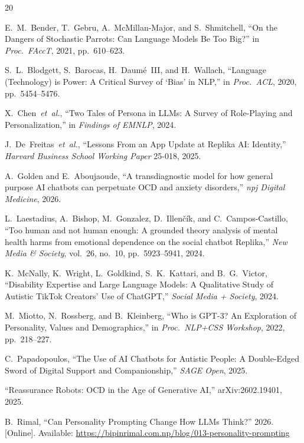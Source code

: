 \documentclass[conference]{IEEEtran}
\begin{document}
\begin{thebibliography}{20}

E.~M.~Bender, T.~Gebru, A.~McMillan-Major, and S.~Shmitchell, ``On the Dangers of Stochastic Parrots: Can Language Models Be Too Big?'' in \textit{Proc.\ FAccT}, 2021, pp.~610--623.

S.~L.~Blodgett, S.~Barocas, H.~Daum\'{e}~III, and H.~Wallach, ``Language (Technology) is Power: A Critical Survey of `Bias' in NLP,'' in \textit{Proc.\ ACL}, 2020, pp.~5454--5476.

X.~Chen~\textit{et~al.}, ``Two Tales of Persona in LLMs: A Survey of Role-Playing and Personalization,'' in \textit{Findings of EMNLP}, 2024.

J.~De~Freitas~\textit{et~al.}, ``Lessons From an App Update at Replika AI: Identity,'' \textit{Harvard Business School Working Paper} 25-018, 2025.

A.~Golden and E.~Aboujaoude, ``A transdiagnostic model for how general purpose AI chatbots can perpetuate OCD and anxiety disorders,'' \textit{npj Digital Medicine}, 2026.

L.~Laestadius, A.~Bishop, M.~Gonzalez, D.~Illen\v{c}\'{i}k, and C.~Campos-Castillo, ``Too human and not human enough: A grounded theory analysis of mental health harms from emotional dependence on the social chatbot Replika,'' \textit{New Media \& Society}, vol.~26, no.~10, pp.~5923--5941, 2024.

K.~McNally, K.~Wright, L.~Goldkind, S.~K.~Kattari, and B.~G.~Victor, ``Disability Expertise and Large Language Models: A Qualitative Study of Autistic TikTok Creators' Use of ChatGPT,'' \textit{Social Media + Society}, 2024.

M.~Miotto, N.~Rossberg, and B.~Kleinberg, ``Who is GPT-3? An Exploration of Personality, Values and Demographics,'' in \textit{Proc.\ NLP+CSS Workshop}, 2022, pp.~218--227.

C.~Papadopoulos, ``The Use of AI Chatbots for Autistic People: A Double-Edged Sword of Digital Support and Companionship,'' \textit{SAGE Open}, 2025.

``Reassurance Robots: OCD in the Age of Generative AI,'' arXiv:2602.19401, 2025.

B.~Rimal, ``Can Personality Prompting Change How LLMs Think?'' 2026. [Online]. Available: \url{https://bipinrimal.com.np/blog/013-personality-prompting}


\end{thebibliography}
\end{document}
